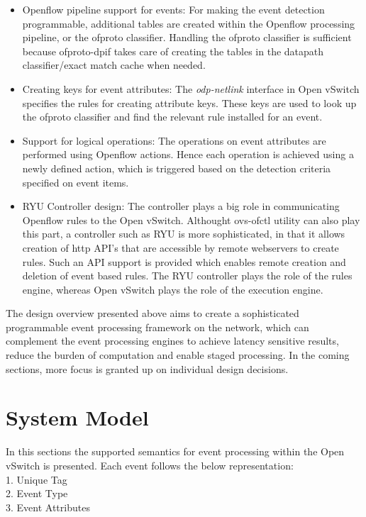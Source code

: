 \begin{itemize}
\begin{figure}[H]
\end{figure}
	\item Openflow pipeline support for events: For making the event detection programmable, additional tables are created within the Openflow processing pipeline, or the ofproto classifier. Handling the ofproto classifier is sufficient because ofproto-dpif takes care of creating the tables in the datapath classifier/exact match cache when needed.
	\item Creating keys for event attributes: The \textit{odp-netlink} interface in Open vSwitch specifies the rules for creating attribute keys. These keys are used to look up the ofproto classifier and find the relevant rule installed for an event. 
	\item Support for logical operations: The operations on event attributes are performed using Openflow actions. Hence each operation is achieved using a newly defined action, which is triggered based on the detection criteria specified on event items.
	\item RYU Controller design: The controller plays a big role in communicating Openflow rules to the Open vSwitch. Althought ovs-ofctl utility can also play this part, a controller such as RYU is more sophisticated, in that it allows creation of http API's that are accessible by remote webservers to create rules. Such an API support is provided which enables remote creation and deletion of event based rules. The RYU controller plays the role of the rules engine, whereas Open vSwitch plays the role of the execution engine. 
\end{itemize}

The design overview presented above aims to create a sophisticated programmable event processing framework on the network, which can complement the event processing engines to achieve latency sensitive results, reduce the burden of computation and enable staged processing. In the coming sections, more focus is granted up on individual design decisions.


\section{System Model}
In this sections the supported semantics for event processing within the Open vSwitch is presented. Each event follows the below representation:\\1. Unique Tag\\
2. Event Type\\3. Event Attributes



